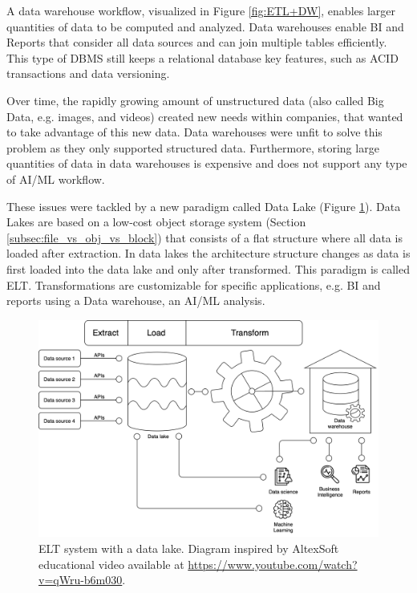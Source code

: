A data warehouse workflow, visualized in Figure \ref{fig:ETL+DW}, enables larger quantities of data to be computed and analyzed. Data warehouses enable \gls{BI} and Reports that consider all data sources and can join multiple tables efficiently. This type of \gls{DBMS} still keeps a relational database key features, such as \gls{ACID} transactions and data versioning.

Over time, the rapidly growing amount of unstructured data (also called Big Data, e.g. images, and videos) created new needs within companies, that wanted to take advantage of this new data. Data warehouses were unfit to solve this problem as they only supported structured data. Furthermore, storing large quantities of data in data warehouses is expensive and does not support any type of \gls{AI}/\gls{ML} workflow.

These issues were tackled by a new paradigm called Data Lake (Figure \ref{fig:ELT+DL}). Data Lakes are based on a low-cost object storage system (Section \ref{subsec:file_vs_obj_vs_block}) that consists of a flat structure where all data is loaded after extraction. In data lakes the architecture structure changes as data is first loaded into the data lake and only after transformed. This paradigm is called \gls{ELT}. Transformations are customizable for specific applications, e.g. \gls{BI} and reports using a Data warehouse, an \gls{AI}/\gls{ML} analysis.

\begin{figure}[!ht]
    \begin{center}
      \includegraphics[width=\textwidth]{figures/2-background/DeltaLake_evolution-ELT+DL.png}
    \end{center}
    \caption[ELT system with a data lake]{\gls{ELT} system with a data lake. Diagram inspired by AltexSoft educational video available at \url{https://www.youtube.com/watch?v=qWru-b6m030}.}
    \label{fig:ELT+DL}
\end{figure}

